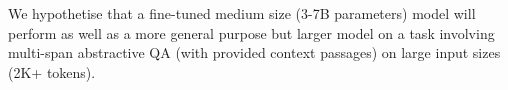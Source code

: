 We hypothetise that a fine-tuned medium size (3-7B parameters) model will perform as well as a more general purpose but larger model on a task involving multi-span abstractive QA (with provided context passages) on large input sizes (2K+ tokens).